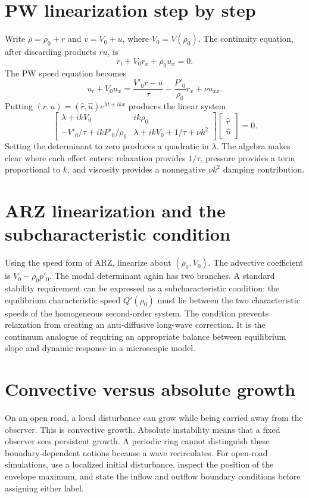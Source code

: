 \documentclass[11pt,a4paper,openany]{book}
\numberwithin{equation}{chapter}
\numberwithin{figure}{chapter}
\numberwithin{table}{chapter}
\begin{document}
\section{PW linearization step by step}
Write $\rho=\rho_0+r$ and $v=V_0+u$, where $V_0=V(\rho_0)$. The continuity equation, after discarding products $ru$, is
\begin{equation}
r_t+V_0r_x+\rho_0u_x=0.
\end{equation}
The PW speed equation becomes
\begin{equation}
u_t+V_0u_x=\frac{V'_0r-u}{\tau}-\frac{P'_0}{\rho_0}r_x+\nu u_{xx}.
\end{equation}
Putting $(r,u)=(\hat r,\hat u)e^{\lambda t+ikx}$ produces the linear system
\begin{equation}
\begin{bmatrix}
\lambda+ikV_0 & ik\rho_0\\
-V'_0/\tau+ikP'_0/\rho_0 & \lambda+ikV_0+1/\tau+\nu k^2
\end{bmatrix}
\begin{bmatrix}\hat r\\\hat u\end{bmatrix}=0.
\end{equation}
Setting the determinant to zero produces a quadratic in $\lambda$. The algebra makes clear where each effect enters: relaxation provides $1/\tau$, pressure provides a term proportional to $k$, and viscosity provides a nonnegative $\nu k^2$ damping contribution.

\section{ARZ linearization and the subcharacteristic condition}
Using the speed form of ARZ, linearize about $(\rho_0,V_0)$. The advective coefficient is $V_0-\rho_0p'_0$. The modal determinant again has two branches. A standard stability requirement can be expressed as a subcharacteristic condition: the equilibrium characteristic speed $Q'(\rho_0)$ must lie between the two characteristic speeds of the homogeneous second-order system. The condition prevents relaxation from creating an anti-diffusive long-wave correction. It is the continuum analogue of requiring an appropriate balance between equilibrium slope and dynamic response in a microscopic model.

\section{Convective versus absolute growth}
On an open road, a local disturbance can grow while being carried away from the observer. This is convective growth. Absolute instability means that a fixed observer sees persistent growth. A periodic ring cannot distinguish these boundary-dependent notions because a wave recirculates. For open-road simulations, use a localized initial disturbance, inspect the position of the envelope maximum, and state the inflow and outflow boundary conditions before assigning either label.
\end{document}
